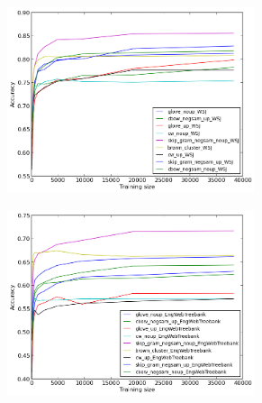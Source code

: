 \documentclass[11pt]{article}
\begin{document}
\begin{figure}
\caption{Out-of-vocabulary-words for \textit{in domain} results for each method for POS}
\centering
\begin{subfigure}{.5\textwidth}
	\centering
    	\includegraphics[width=0.8\textwidth]{plots/POSoutOfVocIN.png}
	\label{fig:inpos}
\end{subfigure}
\begin{subfigure}{.5\textwidth}
	\centering
    	\includegraphics[width=0.8\textwidth]{plots/POSoutOfVocOUT.png}
	\label{fig:outpos}
\end{subfigure}  	
\end{figure} 

\end{document}
